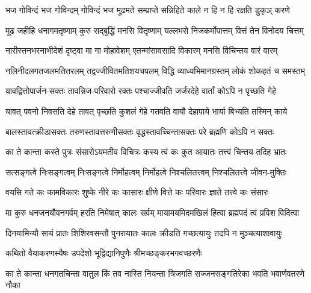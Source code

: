 \setlength{\shlokaspaceskip}{6pt}
\setlength{\columnseprule}{0pt}
\setlength{\columnsep}{10pt}
\begin{large}
\begin{multicols}{2}
\begin{flushleft}
\fourlineindentedshloka
{भज गोविन्दं भज गोविन्दम्}
{गोविन्दं भज मूढमते}
{सम्प्राप्ते सन्निहिते काले}
{न हि न हि रक्षति डुकृञ् करणे}

\fourlineindentedshloka
{मूढ जहीहि धनागमतृष्णाम्}
{कुरु सद्बुद्धिं मनसि वितृष्णाम्}
{यल्लभसे निजकर्मोपात्तम्}
{वित्तं तेन विनोदय चित्तम्}

\fourlineindentedshloka
{नारीस्तनभरनाभीदेशं}
{दृष्ट्वा मा गा मोहावेशम्}
{एतन्मांसावसादि विकारम्}
{मनसि विचिन्तय वारं वारम्}

\fourlineindentedshloka
{नलिनीदलगतजलमतितरलम्}
{तद्वज्जीवितमतिशयचपलम्}
{विद्धि व्याध्यभिमानग्रस्तम्}
{लोकं शोकहतं च समस्तम्}

\fourlineindentedshloka
{यावद्वित्तोपार्जन-सक्तः}
{तावन्निज-परिवारो रक्तः}
{पश्चाज्जीवति जर्जरदेहे}
{वार्तां कोऽपि न पृच्छति गेहे}

\fourlineindentedshloka
{यावत् पवनो निवसति देहे}
{तावत् पृच्छति कुशलं गेहे}
{गतवति वायौ देहापाये}
{भार्या बिभ्यति तस्मिन् काये}

\fourlineindentedshloka
{बालस्तावत्क्रीडासक्तः}
{तरुणस्तावत्तरुणीसक्तः}
{वृद्धस्तावच्चिन्तासक्तः}
{परे ब्रह्मणि कोऽपि न सक्तः}

\fourlineindentedshloka
{का ते कान्ता कस्ते पुत्रः}
{संसारोऽयमतीव विचित्रः}
{कस्य त्वं कः कुत आयातः}
{तत्त्वं चिन्तय तदिह भ्रातः}

\fourlineindentedshloka
{सत्सङ्गत्वे निःसङ्गत्वम्}
{निःसङ्गत्वे निर्मोहत्वम्}
{निर्मोहत्वे निश्चलितत्त्वम्}
{निश्चलितत्त्वे जीवन-मुक्तिः}

\fourlineindentedshloka
{वयसि गते कः कामविकारः}
{शुष्के नीरे कः कासारः}
{क्षीणे वित्ते कः परिवारः}
{ज्ञाते तत्त्वे कः संसारः}

\fourlineindentedshloka
{मा कुरु धनजनयौवनगर्वम्}
{हरति निमेषात् कालः सर्वम्}
{मायामयमिदमखिलं हित्वा}
{ब्रह्मपदं त्वं प्रविश विदित्वा}

\fourlineindentedshloka
{दिनयामिन्यौ सायं प्रातः}
{शिशिरवसन्तौ पुनरायातः}
{कालः क्रीडति गच्छत्यायुः}
{तदपि न मुञ्चत्याशावायुः}

{कथितो वैयाकरणस्यैषः}
{उपदेशो भूद्विद्यानिपुणैः}
{श्रीमच्छङ्करभगवच्छरणैः}

\fourlineindentedshloka
{का ते कान्ता धनगतचिन्ता}
{वातुल किं तव नास्ति नियन्ता}
{त्रिजगति सज्जनसङ्गतिरेका}
{भवति भवार्णवतरणे नौका}


\end{flushleft}
\end{multicols}
\end{large}

